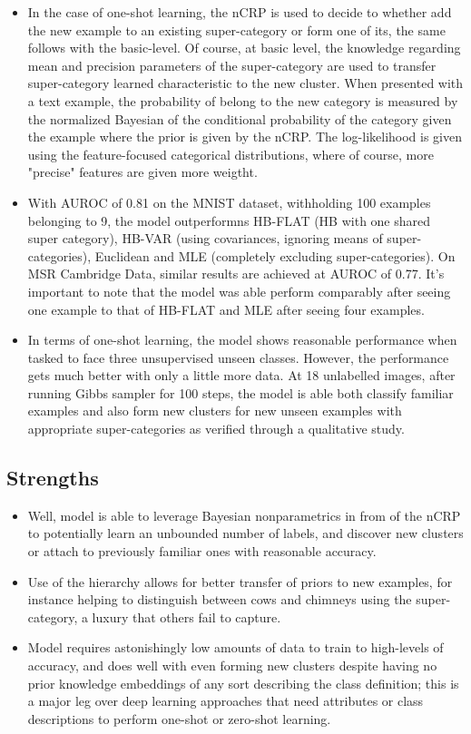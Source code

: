 \documentclass{article}
\begin{document}
\begin{itemize}
    \item In the case of one-shot learning, the nCRP is used to decide to whether add the new example to an existing super-category or form one of its, the same follows with the basic-level. Of course, at basic level, the knowledge regarding mean and precision parameters of the super-category are used to transfer super-category learned characteristic to the new cluster. When presented with a text example, the probability of belong to the new category is measured by the normalized Bayesian of the conditional probability of the category given the example where the prior is given by the nCRP. The log-likelihood is given using the feature-focused categorical distributions, where of course, more "precise" features are given more weigtht.
    \item With AUROC of 0.81 on the MNIST dataset, withholding 100 examples belonging to 9, the model outperformns HB-FLAT (HB with one shared super category), HB-VAR (using covariances, ignoring means of super-categories), Euclidean and MLE (completely excluding super-categories). On MSR Cambridge Data, similar results are achieved at AUROC of 0.77. It's important to note that the model was able perform comparably after seeing one example to that of HB-FLAT and MLE after seeing four examples.
    \item In terms of one-shot learning, the model shows reasonable performance when tasked to face three unsupervised unseen classes. However, the performance gets much better with only a little more data. At 18 unlabelled images, after running Gibbs sampler for 100 steps, the model is able both classify familiar examples and also form new clusters for new unseen examples with appropriate super-categories as verified through a qualitative study.
\end{itemize}

\subsection{Strengths}
\begin{itemize}
    \item Well, model is able to leverage Bayesian nonparametrics in from of the nCRP to potentially learn an unbounded number of labels, and discover new clusters or attach to previously familiar ones with reasonable accuracy.
    \item Use of the hierarchy allows for better transfer of priors to new examples, for instance helping to distinguish between cows and chimneys using the super-category, a luxury that others fail to capture.
    \item Model requires astonishingly low amounts of data to train to high-levels of accuracy, and does well with even forming new clusters despite having no prior knowledge embeddings of any sort describing the class definition; this is a major leg over deep learning approaches that need attributes or class descriptions to perform one-shot or zero-shot learning.
\end{itemize}
\end{document}
